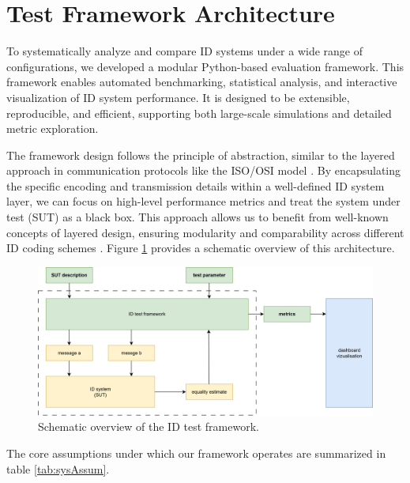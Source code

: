 \documentclass[english,BCOR=4mm,cdfont=false]{tudscrreprt} %
\begin{document}
\section{Test Framework Architecture}
\label{sec:testFramework}
To systematically analyze and compare ID systems under a wide range of configurations, we developed a modular Python-based evaluation framework. This framework enables automated benchmarking, statistical analysis, and interactive visualization of ID system performance. It is designed to be extensible, reproducible, and efficient, supporting both large-scale simulations and detailed metric exploration.

The framework design follows the principle of abstraction, similar to the layered approach in communication protocols like the ISO/OSI model \cite{zimmermann1980osi}. By encapsulating the specific encoding and transmission details within a well-defined ID system layer, we can focus on high-level performance metrics and treat the system under test (SUT) as a black box. This approach allows us to benefit from well-known concepts of layered design, ensuring modularity and comparability across different ID coding schemes \cite{tu2023layered}. Figure \ref{fig:frameworkArchitecture} provides a schematic overview of this architecture.

\begin{figure}[hbt!]
\centering
\includegraphics[width=\textwidth]{images/framework_architecture.png}
\caption{Schematic overview of the ID test framework.}
\label{fig:frameworkArchitecture}
\end{figure}

The core assumptions under which our framework operates are summarized in table \ref{tab:sysAssum}.
\end{document}
